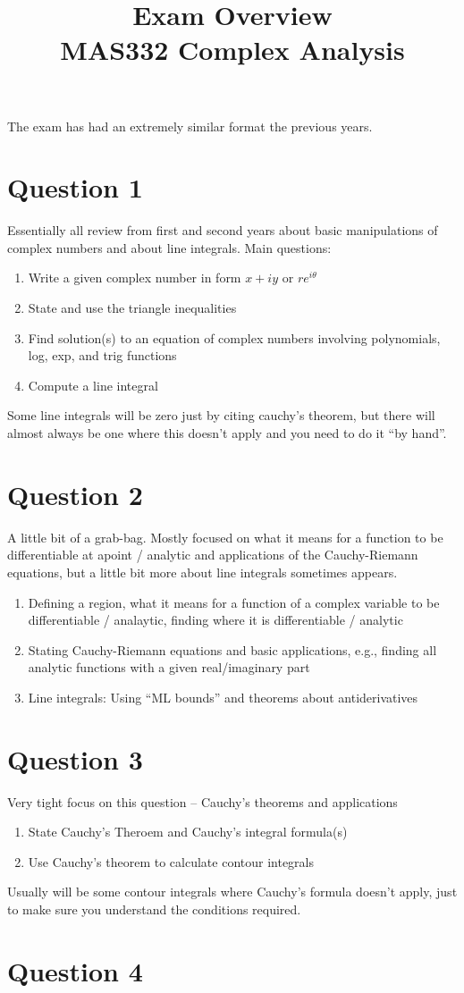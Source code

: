 \documentclass{amsart}
\title{Exam Overview \\ MAS332 Complex Analysis}
\begin{document}
The exam has had an extremely similar format the previous years.  

\section*{Question 1}
Essentially all review from first and second years about basic manipulations of complex numbers and about line integrals.  Main questions:

\begin{enumerate}
\item Write a given complex number in form $x+iy$ or $re^{i\theta}$
\item State and use the triangle inequalities
\item Find solution(s) to an equation of complex numbers involving polynomials, log, exp, and trig functions
  \item Compute a line integral
  \end{enumerate}

Some line integrals will be zero just by citing cauchy's theorem, but there will almost always be one where this doesn't apply and you need to do it ``by hand''.

\section*{Question 2}
A little bit of a grab-bag.  Mostly focused on what it means for a function to be differentiable at apoint / analytic and applications of the Cauchy-Riemann equations, but a little bit more about line integrals sometimes appears.

\begin{enumerate}
\item Defining a region, what it means for a function of a complex variable to be differentiable / analaytic, finding where it is differentiable / analytic
\item Stating Cauchy-Riemann equations and basic applications, e.g., finding all analytic functions with a given real/imaginary part
  \item Line integrals: Using ``ML bounds'' and theorems about antiderivatives
  \end{enumerate}

\section*{Question 3}
Very tight focus on this question -- Cauchy's theorems and applications
\begin{enumerate}
\item State Cauchy's Theroem and Cauchy's integral formula(s)
  \item Use Cauchy's theorem to calculate contour integrals
\end{enumerate}  

Usually will be some contour integrals where Cauchy's formula doesn't apply, just to make sure you understand the conditions required.

\section*{Question 4}
\end{document}
